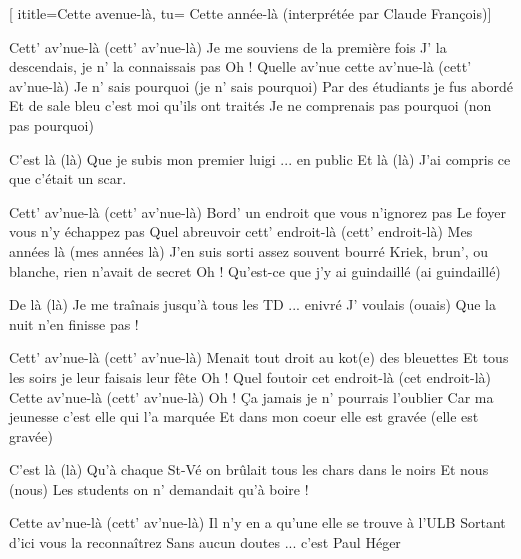  [
ititle={Cette avenue-là},
tu= {Cette année-là (interprétée par Claude François)}]


\beginverse
Cett' av'nue-là (cett' av'nue-là)
Je me souviens de la première fois
J' la descendais, je n' la connaissais pas
Oh ! Quelle av'nue cette av'nue-là (cett' av'nue-là)
Je n' sais pourquoi (je n' sais pourquoi)
Par des étudiants je fus abordé
Et de sale bleu c'est moi qu'ils ont traités
Je ne comprenais pas pourquoi (non pas pourquoi)
\endverse

\beginchorus
C'est là (là)
Que je subis mon premier luigi ... en public
Et là (là)
J'ai compris ce que c'était un scar.
\endchorus

\beginverse
Cett' av'nue-là (cett' av'nue-là)
Bord' un endroit que vous n'ignorez pas
Le foyer vous n'y échappez pas
Quel abreuvoir cett' endroit-là (cett' endroit-là)
Mes années là (mes années là)
J'en suis sorti assez souvent bourré
Kriek, brun', ou blanche, rien n'avait de secret
Oh ! Qu'est-ce que j'y ai guindaillé (ai guindaillé)
\endverse

\beginchorus
De là (là)
Je me traînais jusqu'à tous les TD ... enivré
J' voulais (ouais)
Que la nuit n'en finisse pas !
\endchorus

\beginverse
Cett' av'nue-là (cett' av'nue-là)
Menait tout droit au kot(e) des bleuettes
Et tous les soirs je leur faisais leur fête
Oh ! Quel foutoir cet endroit-là (cet endroit-là)
Cette av'nue-là (cett' av'nue-là)
Oh ! Ça jamais je n' pourrais l'oublier
Car ma jeunesse c'est elle qui l'a marquée
Et dans mon coeur elle est gravée (elle est gravée)
\endverse

\beginchorus
C'est là (là)
Qu'à chaque St-Vé on brûlait tous les chars dans le noirs
Et nous (nous)
Les students on n' demandait qu'à boire !
\endchorus

\beginverse
Cette av'nue-là (cett' av'nue-là)
Il n'y en a qu'une elle se trouve à l'ULB
Sortant d'ici vous la reconnaîtrez
Sans aucun doutes ... c'est Paul Héger
\endverse

\endsong